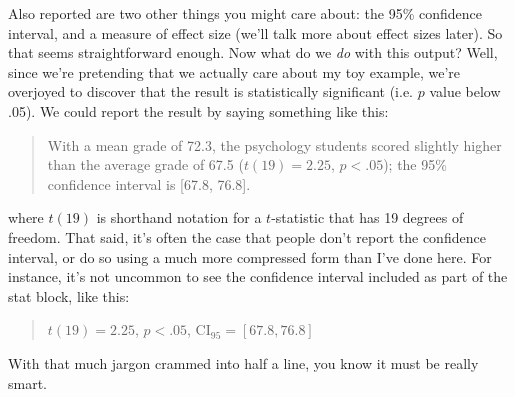 Also reported are two other things you might care about: the 95\% confidence interval, and a measure of effect size (we'll talk more about effect sizes later). So that seems straightforward enough. Now what do we {\it do} with this output? Well, since we're pretending that we actually care about my toy example, we're overjoyed to discover that the result is statistically significant (i.e. $p$ value below .05). We could report the result by saying something like this:
\begin{quote}
With a mean grade of 72.3, the psychology students scored slightly higher than the average grade of 67.5 ($t(19) = 2.25$, $p<.05$); the 95\% confidence interval is [67.8, 76.8].
\end{quote}
where $t(19)$ is shorthand notation for a $t$-statistic that has 19 degrees of freedom. That said, it's often the case that people don't report the confidence interval, or do so using a much more compressed form than I've done here. For instance, it's not uncommon to see the confidence interval included as part of the stat block, like this:
\begin{quote}
$t(19) = 2.25$, $p<.05$, CI$_{95} = [67.8, 76.8]$
\end{quote}
With that much jargon crammed into half a line, you know it must be really smart.




